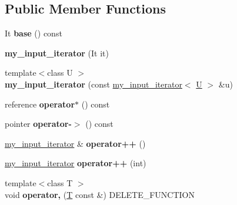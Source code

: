 \subsection*{Public Member Functions}
\begin{DoxyCompactItemize}
\item 
\mbox{\label{classmy__input__iterator_a45e816ac71a8a75050095928b2e2f053}} 
It {\bfseries base} () const
\item 
\mbox{\label{classmy__input__iterator_af17753d542ee2a557baba2e9bde23c4c}} 
{\bfseries my\+\_\+input\+\_\+iterator} (It it)
\item 
\mbox{\label{classmy__input__iterator_a28c110da23e68581bf3f99b9c1028750}} 
{\footnotesize template$<$class U $>$ }\\{\bfseries my\+\_\+input\+\_\+iterator} (const \mbox{\hyperlink{classmy__input__iterator}{my\+\_\+input\+\_\+iterator}}$<$ \mbox{\hyperlink{union_u}{U}} $>$ \&u)
\item 
\mbox{\label{classmy__input__iterator_a68ef3338046fce2b8bf989bf97d35f64}} 
reference {\bfseries operator$\ast$} () const
\item 
\mbox{\label{classmy__input__iterator_a900174babfc87ff6bad817120e41dfa5}} 
pointer {\bfseries operator-\/$>$} () const
\item 
\mbox{\label{classmy__input__iterator_a4eb589c3c433068becfe3761ee72cc70}} 
\mbox{\hyperlink{classmy__input__iterator}{my\+\_\+input\+\_\+iterator}} \& {\bfseries operator++} ()
\item 
\mbox{\label{classmy__input__iterator_a68d943775a9842dd4ecea5a814648a75}} 
\mbox{\hyperlink{classmy__input__iterator}{my\+\_\+input\+\_\+iterator}} {\bfseries operator++} (int)
\item 
\mbox{\label{classmy__input__iterator_ab1377d4f7b529accea6272d73a721722}} 
{\footnotesize template$<$class T $>$ }\\void {\bfseries operator,} (\mbox{\hyperlink{struct_t}{T}} const \&) D\+E\+L\+E\+T\+E\+\_\+\+F\+U\+N\+C\+T\+I\+ON
\end{DoxyCompactItemize}
